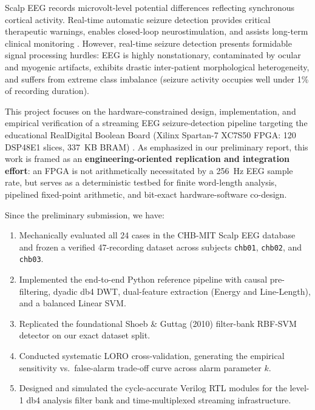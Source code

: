 \documentclass[10pt,twocolumn,letterpaper]{article}
\begin{document}
Scalp EEG records microvolt-level potential differences reflecting synchronous cortical activity. Real-time automatic seizure detection provides critical therapeutic warnings, enables closed-loop neurostimulation, and assists long-term clinical monitoring \cite{shoeb2010icml}. However, real-time seizure detection presents formidable signal processing hurdles: EEG is highly nonstationary, contaminated by ocular and myogenic artifacts, exhibits drastic inter-patient morphological heterogeneity, and suffers from extreme class imbalance (seizure activity occupies well under 1\% of recording duration).

This project focuses on the hardware-constrained design, implementation, and empirical verification of a streaming EEG seizure-detection pipeline targeting the educational RealDigital Boolean Board (Xilinx Spartan-7 XC7S50 FPGA: 120 DSP48E1 slices, 337~KB BRAM) \cite{booleanmanual}. As emphasized in our preliminary report, this work is framed as an \textbf{engineering-oriented replication and integration effort}: an FPGA is not arithmetically necessitated by a 256~Hz EEG sample rate, but serves as a deterministic testbed for finite word-length analysis, pipelined fixed-point arithmetic, and bit-exact hardware-software co-design.

Since the preliminary submission, we have:
\begin{enumerate}
    \item Mechanically evaluated all 24 cases in the CHB-MIT Scalp EEG database \cite{guttag2010chbmit} and frozen a verified 47-recording dataset across subjects \texttt{chb01}, \texttt{chb02}, and \texttt{chb03}.
    \item Implemented the end-to-end Python reference pipeline with causal pre-filtering, dyadic db4 DWT, dual-feature extraction (Energy and Line-Length), and a balanced Linear SVM.
    \item Replicated the foundational Shoeb \& Guttag (2010) filter-bank RBF-SVM detector \cite{shoeb2010icml} on our exact dataset split.
    \item Conducted systematic LORO cross-validation, generating the empirical sensitivity vs.\ false-alarm trade-off curve across alarm parameter $k$.
    \item Designed and simulated the cycle-accurate Verilog RTL modules for the level-1 db4 analysis filter bank and time-multiplexed streaming infrastructure.
\end{enumerate}

\end{document}
